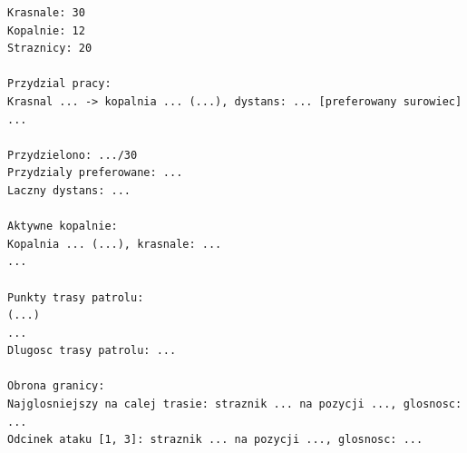 \documentclass{article}
\begin{document}
\begin{lstlisting}[caption={Przykładowe wyjście programu}]
Krasnale: 30
Kopalnie: 12
Straznicy: 20

Przydzial pracy:
Krasnal ... -> kopalnia ... (...), dystans: ... [preferowany surowiec]
...

Przydzielono: .../30
Przydzialy preferowane: ...
Laczny dystans: ...

Aktywne kopalnie:
Kopalnia ... (...), krasnale: ...
...

Punkty trasy patrolu:
(...)
...
Dlugosc trasy patrolu: ...

Obrona granicy:
Najglosniejszy na calej trasie: straznik ... na pozycji ..., glosnosc: ...
Odcinek ataku [1, 3]: straznik ... na pozycji ..., glosnosc: ...
\end{lstlisting}
\end{document}
